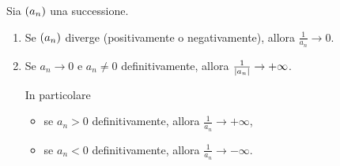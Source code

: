 \begin{proposition}
     \label{prop:alg_inf_recip}
    Sia $\seqn*{a}$ una successione.
    \begin{enumerate}[label={(\roman*)}, ref={\theproposition: (\roman*)}]
        \item Se $\seqn*{a}$ diverge (positivamente o negativamente), allora $\frac{1}{a_n} \to 0$.
        \item Se $a_n \to 0$ e $a_n \neq 0$ definitivamente, allora $\frac{1}{\abs*{a_n}} \to +\infty$.
        
        In particolare \begin{itemize}
            \item se $a_n > 0$ definitivamente, allora $\frac{1}{a_n} \to +\infty$,
            \item se $a_n < 0$ definitivamente, allora $\frac{1}{a_n} \to -\infty$.
        \end{itemize}
    \end{enumerate}
\end{proposition}
